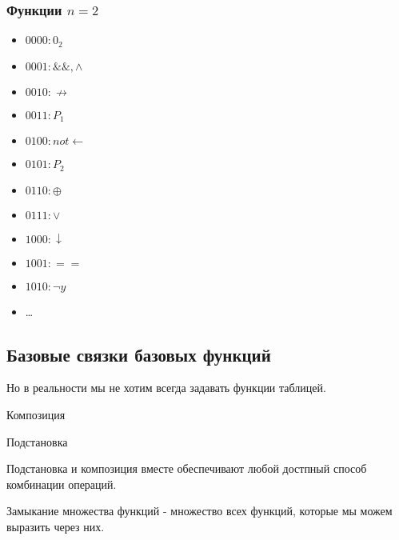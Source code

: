 \documentclass[a4paper, 12pt]{article}
\begin{document}
    \subsubsection{Функции $n = 2$}
    \begin{itemize}
        \item $0000: 0_2$
        \item $0001: \&\&, \land$
        \item $0010: \not \rightarrow$
        \item $0011: P_1$
        \item $0100: not \leftarrow$
        \item $0101: P_2$
        \item $0110: \oplus$
        \item $0111: \vee$
        \item $1000: \downarrow$
        \item $1001: ==$
        \item $1010: \lnot y$
        \item \dots %
    \end{itemize}



    \subsection{Базовые связки базовых функций}

    Но в реальности мы не хотим всегда задавать функции таблицей. 

    \begin{definition}
        Композиция
    \end{definition}

    \begin{definition}
        Подстановка
    \end{definition}

    Подстановка и композиция вместе обеспечивают любой достпный способ комбинации операций.

    \begin{definition}
        Замыкание множества функций - множество всех функций, которые мы можем выразить через них.
    \end{definition}
\end{document}
